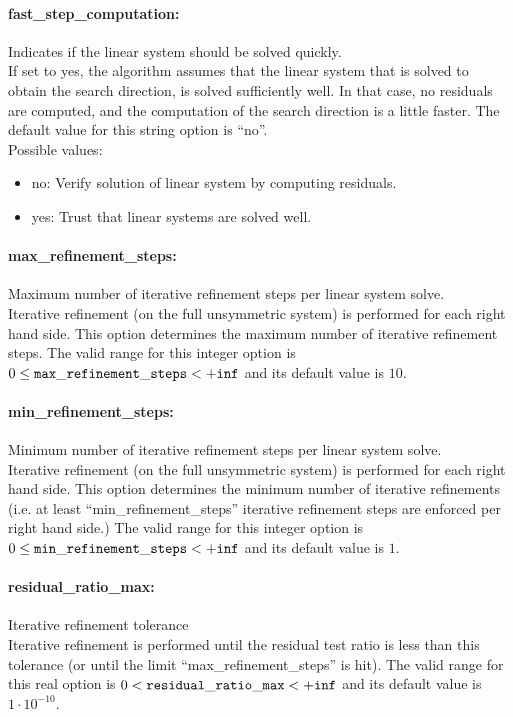 \paragraph{fast\_step\_computation:} Indicates if the linear system should be solved quickly. $\;$ \\
 If set to yes, the algorithm assumes that the
linear system that is solved to obtain the search
direction, is solved sufficiently well. In that
case, no residuals are computed, and the
computation of the search direction is a little
faster.
The default value for this string option is ``no''.
\\ 
Possible values:
\begin{itemize}
   \item no: Verify solution of linear system by computing
residuals.
   \item yes: Trust that linear systems are solved well.
\end{itemize}

\paragraph{max\_refinement\_steps:} Maximum number of iterative refinement steps per linear system solve. $\;$ \\
 Iterative refinement (on the full unsymmetric
system) is performed for each right hand side. 
This option determines the maximum number of
iterative refinement steps. The valid range for this integer option is
$0 \le {\tt max\_refinement\_steps } <  {\tt +inf}$
and its default value is $10$.


\paragraph{min\_refinement\_steps:} Minimum number of iterative refinement steps per linear system solve. $\;$ \\
 Iterative refinement (on the full unsymmetric
system) is performed for each right hand side. 
This option determines the minimum number of
iterative refinements (i.e. at least
``min\_refinement\_steps'' iterative refinement
steps are enforced per right hand side.) The valid range for this integer option is
$0 \le {\tt min\_refinement\_steps } <  {\tt +inf}$
and its default value is $1$.

\paragraph{residual\_ratio\_max:} Iterative refinement tolerance $\;$ \\
 Iterative refinement is performed until the
residual test ratio is less than this tolerance
(or until the limit ``max\_refinement\_steps'' is hit). The valid range for this real option is 
$0 <  {\tt residual\_ratio\_max } <  {\tt +inf}$
and its default value is $1 \cdot 10^{-10}$.


